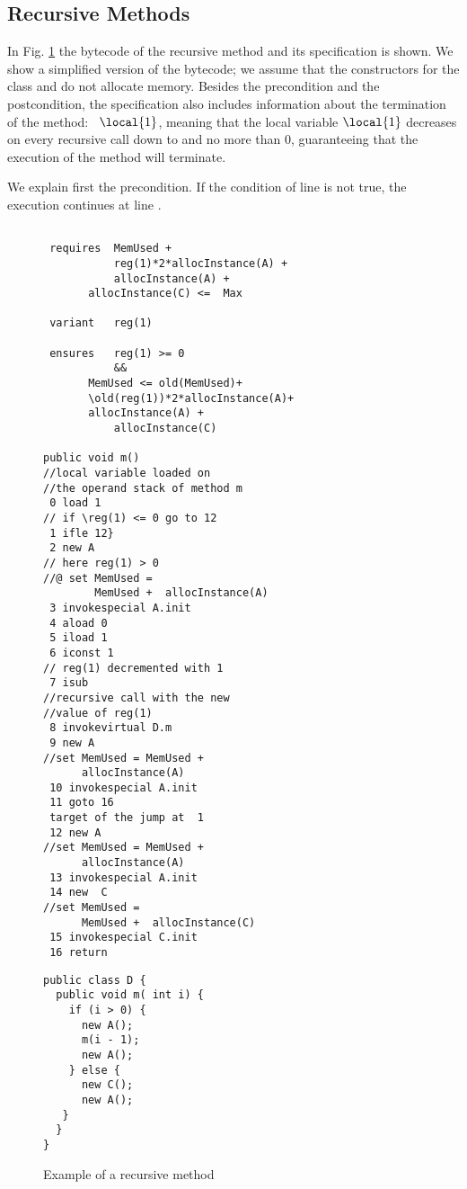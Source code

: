 \subsection{Recursive Methods} In Fig. \ref{recMeth} the bytecode of the recursive method \methodd{} and its specification is shown. 
 We show a simplified version of the bytecode; we assume that the constructors for the class  and 
 do not allocate memory. Besides the precondition and the postcondition, the specification also includes information 
 about the termination of the method: \variant\ $\local{1}$, meaning that the local variable $\local{1}$ decreases on every recursive call down to and no more than $0$, guaranteeing
 that the execution of the method will terminate.
 

We explain first the precondition. If the condition of line  is not true, the execution continues at line .

\begin{figure}[!hbp]

\begin{minipage}[t]{90mm}
\begin{lstlisting}[frame=trbl]

 requires  MemUsed +
           reg(1)*2*allocInstance(A) + 
           allocInstance(A) +
	   allocInstance(C) <=  Max 

 variant   reg(1) 

 ensures   reg(1) >= 0 
           &&
	   MemUsed <= old(MemUsed)+  
	   \old(reg(1))*2*allocInstance(A)+
	   allocInstance(A) + 
           allocInstance(C)
 
public void m()
//local variable loaded on 
//the operand stack of method m
 0 load 1
// if \reg(1) <= 0 go to 12
 1 ifle 12}
 2 new A 
// here reg(1) > 0 
//@ set MemUsed =
        MemUsed +  allocInstance(A)
 3 invokespecial A.init
 4 aload 0
 5 iload 1
 6 iconst 1
// reg(1) decremented with 1
 7 isub
//recursive call with the new 
//value of reg(1)
 8 invokevirtual D.m
 9 new A
//set MemUsed = MemUsed + 
      allocInstance(A)
 10 invokespecial A.init
 11 goto 16
 target of the jump at  1
 12 new A
//set MemUsed = MemUsed + 
      allocInstance(A)
 13 invokespecial A.init
 14 new  C
//set MemUsed =
      MemUsed +  allocInstance(C)
 15 invokespecial C.init
 16 return
\end{lstlisting} 
\end{minipage}

\phantom{aaaaa}

\begin{minipage}[t]{90mm}
\begin{lstlisting}[frame=trbl]
public class D {
  public void m( int i) {
    if (i > 0) {
      new A();
      m(i - 1);
      new A();
    } else {
      new C();
      new A();
   }
  }
}
\end{lstlisting} 
\end{minipage}
\caption{\sc Example of a recursive method}
 \label{recMeth}
\end{figure}

